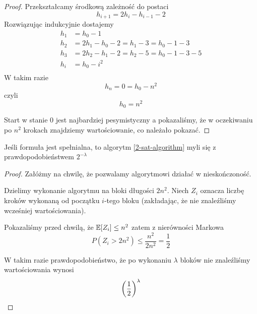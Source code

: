 \begin{proof}
    Przekształcamy środkową zależność do postaci
    \[
        h_{i + 1} = 2h_i - h_{i - 1} - 2
    \]
    Rozwiązując indukcyjnie dostajemy
    \begin{align*}
        h_1 &= h_0 - 1 \\
        h_2 &= 2h_1 - h_0 - 2 = h_1 - 3 = h_0 - 1 - 3 \\
        h_3 &= 2h_2 - h_1 - 2 = h_2 - 5 = h_0 - 1 - 3 - 5 \\
        h_i &= h_0 - i^2 \\
    \end{align*}
    W takim razie
    \[
        h_n = 0 = h_0 - n^2
    \]
    czyli \[ h_0 = n^2 \]
    
    Start w stanie 0 jest najbardziej pesymistyczny a pokazaliśmy, że w oczekiwaniu po \( n^2 \) krokach znajdziemy wartościowanie, co należało pokazać.
\end{proof}

\begin{theorem}[Lemat 7.2 P\&C]
    Jeśli formuła jest spełnialna, to algorytm \ref{2-sat-algorithm} myli się z prawdopodobieństwem \( 2^{-\lambda} \)
\end{theorem}
\begin{proof}
    Załóżmy na chwilę, że pozwalamy algorytmowi działać w nieskończoność.
    
    Dzielimy wykonanie algorytmu na bloki długości \( 2n^2 \).
    Niech \( Z_i \) oznacza liczbę kroków wykonaną od początku \( i \)-tego bloku (zakładając, że nie znaleźliśmy wcześniej wartościowania).
    
    Pokazaliśmy przed chwilą, że \(\expected{Z_i} \leq n^2\) zatem z nierówności Markowa
    \[
        P(Z_i > 2n^2) \leq \frac{n^2}{2n^2} = \frac{1}{2}
    \]
    
    W takim razie prawdopodobieństwo, że po wykonaniu \( \lambda \) bloków nie znaleźliśmy wartościowania wynosi
    \[
        \left(\frac{1}{2}\right)^\lambda
    \]
    
\end{proof}
